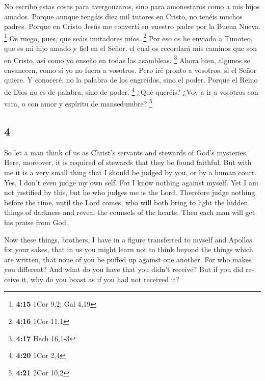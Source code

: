 \begin{paracol}{2}
 No escribo estas cosas para avergonzaros, sino para
amonestaros como a mis hijos amados.  Porque aunque
tengáis diez mil tutores en Cristo, no tenéis muchos padres. Porque en
Cristo Jesús me convertí en vuestro padre por la Buena Nueva.
\footnote{\textbf{4:15} 1Cor 9,2; Gal 4,19}  Os ruego,
pues, que seáis imitadores míos. \footnote{\textbf{4:16} 1Cor 11,1}
 Por eso os he enviado a Timoteo, que es mi hijo amado y
fiel en el Señor, el cual os recordará mis caminos que son en Cristo,
así como yo enseño en todas las asambleas. \footnote{\textbf{4:17} Hech
  16,1-3}  Ahora bien, algunos se envanecen, como si yo
no fuera a vosotros.  Pero iré pronto a vosotros, si el
Señor quiere. Y conoceré, no la palabra de los engreídos, sino el poder.
 Porque el Reino de Dios no es de palabra, sino de poder.
\footnote{\textbf{4:20} 1Cor 2,4}  ¿Qué queréis? ¿Voy a
ir a vosotros con vara, o con amor y espíritu de mansedumbre?
\footnote{\textbf{4:21} 2Cor 10,2}

\switchcolumn
\begin{otherlanguage}{english}

\hypertarget{section-7}{%
\section{4}\label{section-7}}

 So let a man think of us as Christ's servants and
stewards of God's mysteries.  Here, moreover, it is
required of stewards that they be found faithful.  But
with me it is a very small thing that I should be judged by you, or by a
human court. Yes, I don't even judge my own self.  For I
know nothing against myself. Yet I am not justified by this, but he who
judges me is the Lord.  Therefore judge nothing before the
time, until the Lord comes, who will both bring to light the hidden
things of darkness and reveal the counsels of the hearts. Then each man
will get his praise from God.

 Now these things, brothers, I have in a figure
transferred to myself and Apollos for your sakes, that in us you might
learn not to think beyond the things which are written, that none of you
be puffed up against one another.  For who makes you
different? And what do you have that you didn't receive? But if you did
receive it, why do you boast as if you had not received it?


\end{otherlanguage}
\end{paracol}
